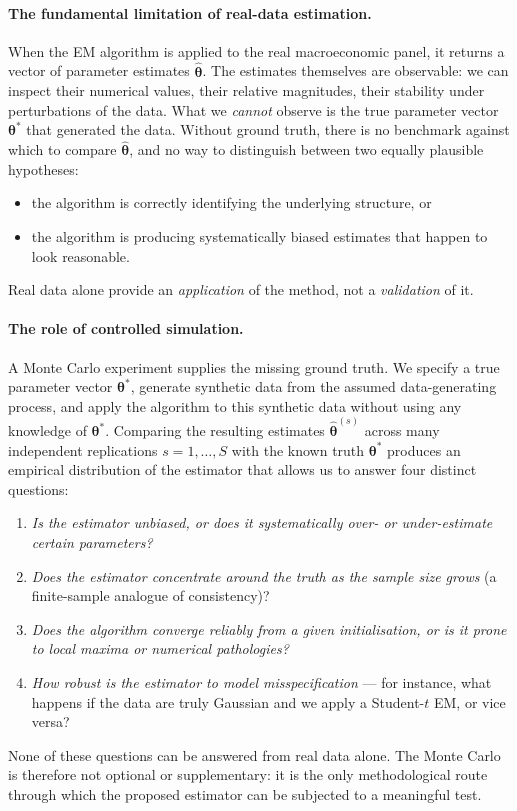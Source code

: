 \documentclass[11pt, a4paper, oneside]{article}
\newcommand{\btheta}{\boldsymbol{\theta}}
\begin{document}
\paragraph{The fundamental limitation of real-data estimation.}
When the EM algorithm is applied to the real macroeconomic panel, it
returns a vector of parameter estimates $\hat{\btheta}$. The estimates
themselves are observable: we can inspect their numerical values,
their relative magnitudes, their stability under perturbations of the
data. What we \emph{cannot} observe is the true parameter vector
$\btheta^*$ that generated the data. Without ground truth, there is no
benchmark against which to compare $\hat{\btheta}$, and no way to
distinguish between two equally plausible hypotheses:
\begin{itemize}[leftmargin=1.5em, itemsep=2pt]
    \item the algorithm is correctly identifying the underlying
          structure, or
    \item the algorithm is producing systematically biased estimates
          that happen to look reasonable.
\end{itemize}
Real data alone provide an \emph{application} of the method, not a
\emph{validation} of it.

\paragraph{The role of controlled simulation.}
A Monte Carlo experiment supplies the missing ground truth. We
specify a true parameter vector $\btheta^*$, generate synthetic data
from the assumed data-generating process, and apply the algorithm to
this synthetic data without using any knowledge of $\btheta^*$.
Comparing the resulting estimates $\hat{\btheta}^{(s)}$ across many
independent replications $s = 1, \ldots, S$ with the known truth
$\btheta^*$ produces an empirical distribution of the estimator that
allows us to answer four distinct questions:
\begin{enumerate}[leftmargin=1.5em, itemsep=3pt]
    \item \emph{Is the estimator unbiased, or does it systematically
          over- or under-estimate certain parameters?}
    \item \emph{Does the estimator concentrate around the truth as
          the sample size grows} (a finite-sample analogue of
          consistency)?
    \item \emph{Does the algorithm converge reliably from a given
          initialisation, or is it prone to local maxima or
          numerical pathologies?}
    \item \emph{How robust is the estimator to model misspecification}
          — for instance, what happens if the data are truly Gaussian
          and we apply a Student-$t$ EM, or vice versa?
\end{enumerate}
None of these questions can be answered from real data alone. The
Monte Carlo is therefore not optional or supplementary: it is the
only methodological route through which the proposed estimator can
be subjected to a meaningful test.
\end{document}
